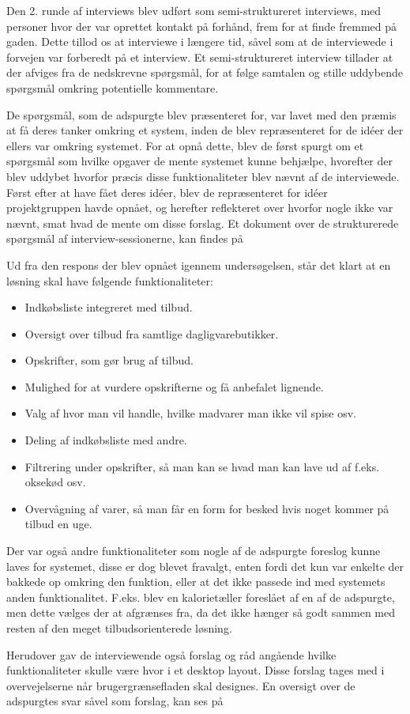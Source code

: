 Den 2. runde af interviews blev udført som semi-struktureret interviews, med personer hvor der var oprettet kontakt på forhånd, frem for at finde fremmed på gaden.
Dette tillod os at interviewe i længere tid, såvel som at de interviewede i forvejen var forberedt på et interview.
Et semi-struktureret interview tillader at der afviges fra de nedskrevne spørgsmål, for at følge samtalen og stille uddybende spørgsmål omkring potentielle kommentare.

De spørgsmål, som de adspurgte blev præsenteret for, var lavet med den præmis at få deres tanker omkring et system, inden de blev repræsenteret for de idéer der ellers var omkring systemet.
For at opnå dette, blev de først spurgt om et spørgsmål som hvilke opgaver de mente systemet kunne behjælpe, hvorefter der blev uddybet hvorfor præcis disse funktionaliteter blev nævnt af de interviewede.
Først efter at have fået deres idéer, blev de repræsenteret for idéer projektgruppen havde opnået, og herefter reflekteret over hvorfor nogle ikke var nævnt, smat hvad de mente om disse forslag.
Et dokument over de strukturerede spørgsmål af interview-sessionerne, kan findes på %

Ud fra den respons der blev opnået igennem undersøgelsen, står det klart at en løsning skal have følgende funktionaliteter:

\begin{itemize}
	\item Indkøbsliste integreret med tilbud.
	\item Oversigt over tilbud fra samtlige dagligvarebutikker.
	\item Opskrifter, som gør brug af tilbud.
	\item Mulighed for at vurdere opskrifterne og få anbefalet lignende.
	\item Valg af hvor man vil handle, hvilke madvarer man ikke vil spise osv.
	\item Deling af indkøbsliste med andre.
	\item Filtrering under opskrifter, så man kan se hvad man kan lave ud af f.eks. oksekød osv.
	\item Overvågning af varer, så man får en form for besked hvis noget kommer på tilbud en uge.
\end{itemize}

Der var også andre funktionaliteter som nogle af de adspurgte foreslog kunne laves for systemet, disse er dog blevet fravalgt, enten fordi det kun var enkelte der bakkede op omkring den funktion, eller at det ikke passede ind med systemets anden funktionalitet.
F.eks. blev en kalorietæller foreslået af en af de adspurgte, men dette vælges der at afgrænses fra, da det ikke hænger så godt sammen med resten af den meget tilbudsorienterede løsning.

Herudover gav de interviewende også forslag og råd angående hvilke funktionaliteter skulle være hvor i et desktop layout.
Disse forslag tages med i overvejelserne når brugergrænsefladen skal designes.
En oversigt over de adspurgtes svar såvel som forslag, kan ses på %
